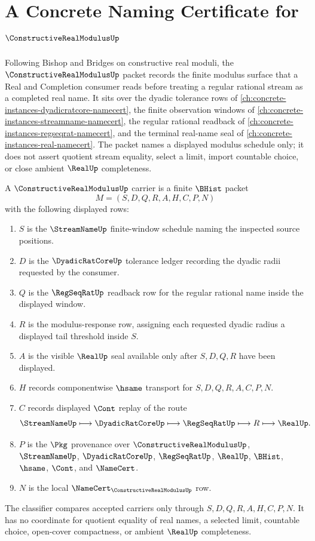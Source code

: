\chapter{A Concrete Naming Certificate for $\ConstructiveRealModulusUp$}
\label{ch:concrete-instances-constructive-real-modulus-namecert}

Following Bishop and Bridges on constructive real moduli, the
$\ConstructiveRealModulusUp$ packet records the finite modulus surface that a
Real and Completion consumer reads before treating a regular rational stream as
a completed real name. It sits over the dyadic tolerance rows of
\autoref{ch:concrete-instances-dyadicratcore-namecert}, the finite observation
windows of \autoref{ch:concrete-instances-streamname-namecert}, the regular
rational readback of \autoref{ch:concrete-instances-regseqrat-namecert}, and the
terminal real-name seal of \autoref{ch:concrete-instances-real-namecert}. The
packet names a displayed modulus schedule only; it does not assert quotient
stream equality, select a limit, import countable choice, or close ambient
$\RealUp$ completeness.

\begin{definition}
\label{def:constructive-real-modulus-carrier}
A $\ConstructiveRealModulusUp$ carrier is a finite $\BHist$ packet
$$
M=(S,D,Q,R,A,H,C,P,N)
$$
with the following displayed rows:
\begin{enumerate}
\item $S$ is the $\StreamNameUp$ finite-window schedule naming the inspected
source positions.
\item $D$ is the $\DyadicRatCoreUp$ tolerance ledger recording the dyadic
radii requested by the consumer.
\item $Q$ is the $\RegSeqRatUp$ readback row for the regular rational name
inside the displayed window.
\item $R$ is the modulus-response row, assigning each requested dyadic radius a
displayed tail threshold inside $S$.
\item $A$ is the visible $\RealUp$ seal available only after $S,D,Q,R$ have
been displayed.
\item $H$ records componentwise $\hsame$ transport for $S,D,Q,R,A,C,P,N$.
\item $C$ records displayed $\Cont$ replay of the route
$$
\StreamNameUp \longmapsto \DyadicRatCoreUp \longmapsto \RegSeqRatUp
\longmapsto R \longmapsto \RealUp .
$$
\item $P$ is the $\Pkg$ provenance over $\ConstructiveRealModulusUp$,
$\StreamNameUp$, $\DyadicRatCoreUp$, $\RegSeqRatUp$, $\RealUp$, $\BHist$,
$\hsame$, $\Cont$, and $\NameCert$.
\item $N$ is the local $\NameCert_{\ConstructiveRealModulusUp}$ row.
\end{enumerate}
The classifier compares accepted carriers only through $S,D,Q,R,A,H,C,P,N$.
It has no coordinate for quotient equality of real names, a selected limit,
countable choice, open-cover compactness, or ambient $\RealUp$ completeness.
\end{definition}

